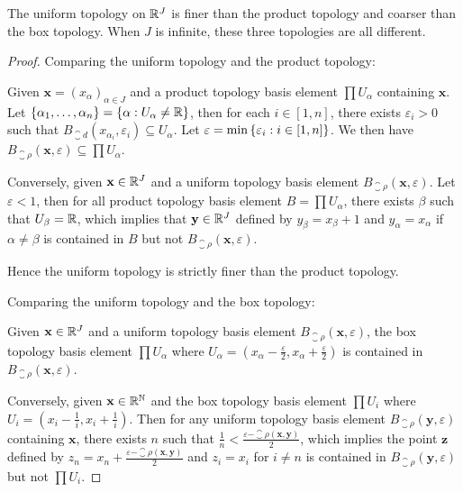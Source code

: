 \documentclass[12pt,a4paper]{article}
\begin{document}
    \begin{thm}
        The uniform topology on $\mathbb{R}^J$ is finer than the product topology and coarser than the box topology. When $J$ is infinite, these three topologies are all different.
    \end{thm}
    \begin{proof}
        Comparing the uniform topology and the product topology:
        \vspace{0.3em}
        
        Given $\mathbf{x}=(x_\alpha)_{\alpha\in J}$ and a product topology basis element $\prod U_\alpha$ containing $\mathbf{x}$. Let $\left\{\alpha_1,\dots,\alpha_n\right\}=\left\{\alpha:U_\alpha\neq\mathbb{R}\right\}$, then for each $i\in[1,n]$, there exists $\varepsilon_i>0$ such that $B_{\closure{d}}(x_{\alpha_i},\varepsilon_i)\subseteq U_\alpha$. Let $\varepsilon=\min\left\{\varepsilon_i:i\in[1,n]\right\}$. We then have $B_{\closure{\rho}}(\mathbf{x},\varepsilon)\subseteq\prod U_{\alpha}$.
        \vspace{0.3em}
        
        Conversely, given $\mathbf{x}\in\mathbb{R}^J$ and a uniform topology basis element $B_{\closure{\rho}}(\mathbf{x},\varepsilon)$. Let $\varepsilon<1$, then for all product topology basis element $B=\prod U_\alpha$, there exists $\beta$ such that $U_{\beta}=\mathbb{R}$, which implies that $\mathbf{y}\in\mathbb{R}^J$ defined by $y_\beta=x_\beta+1$ and $y_\alpha=x_\alpha$ if $\alpha\neq\beta$ is contained in $B$ but not $B_{\closure{\rho}}(\mathbf{x},\varepsilon)$.
        \vspace{0.3em}
        
        Hence the uniform topology is strictly finer than the product topology.
        \vspace{0.5em}

        Comparing the uniform topology and the box topology:
        \vspace{0.3em}

        Given $\mathbf{x}\in\mathbb{R}^J$ and a uniform topology basis element $B_{\closure{\rho}}(\mathbf{x},\varepsilon)$, the box topology basis element $\prod U_\alpha$ where $U_\alpha=(x_\alpha-\frac{\varepsilon}{2},x_\alpha+\frac{\varepsilon}{2})$ is contained in $B_{\closure{\rho}}(\mathbf{x},\varepsilon)$.
        \vspace{0.3em}

        Conversely, given $\mathbf{x}\in\mathbb{R}^{\mathbb{N}}$ and the box topology basis element $\prod U_i$ where $U_i=(x_i-\frac{1}{i},x_i+\frac{1}{i})$. Then for any uniform topology basis element $B_{\closure{\rho}}(\mathbf{y},\varepsilon)$ containing $\mathbf{x}$, there exists $n$ such that $\frac{1}{n}<\frac{\varepsilon-\closure{\rho}(\mathbf{x},\mathbf{y})}{2}$, which implies the point $\mathbf{z}$ defined by $z_n=x_n+\frac{\varepsilon-\closure{\rho}(\mathbf{x},\mathbf{y})}{2}$ and $z_i=x_i$ for $i\neq n$ is contained in $B_{\closure{\rho}}(\mathbf{y},\varepsilon)$ but not $\prod U_i$.
    \end{proof}
\end{document}
